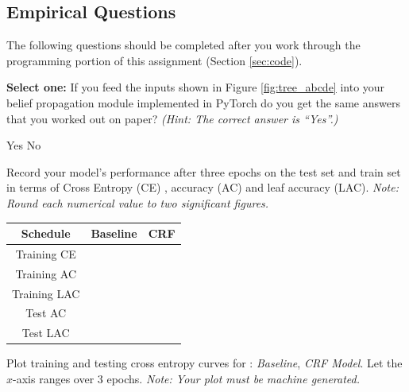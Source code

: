 \documentclass[11pt,addpoints,answers]{exam}
\numberwithin{equation}{section} %
\numberwithin{figure}{section} %
\numberwithin{table}{section} %
\begin{document}
\clearpage
\subsection{Empirical Questions}

The following questions should be completed after you work through the programming portion of this assignment (Section \ref{sec:code}). 

\begin{questions}

\question[1] \textbf{Select one:} If you feed the inputs shown in Figure \ref{fig:tree_abcde} into your belief propagation module implemented in PyTorch do you get the same answers that you worked out on paper? \textit{(Hint: The correct answer is ``Yes''.)}
    \begin{checkboxes}
     \choice Yes
     \choice No
    \end{checkboxes}

\question[10] Record your model's performance after three epochs on the test set and train set in terms of Cross Entropy (CE) , accuracy (AC) and leaf accuracy (LAC). \emph{Note: Round each numerical value to two significant figures.}


\bgroup
\def\arraystretch{1.5}
\begin{center}
\begin{tabular}{ |c|p{2cm}|p{1cm}| } 
 \hline
 \textbf{Schedule} & \textbf{ Baseline} &  \textbf{CRF } \\
 \hline
Training CE &  & \\ 
 \hline
 Training AC &  &  \\ 
 \hline

Training LAC &  &  \\ 
 \hline

Test AC &  &  \\ 
 \hline

Test LAC &  &  \\ 
 \hline


\end{tabular}
\end{center}
\egroup

\question[10] Plot training and testing cross entropy curves for : \emph{Baseline}, \textit{CRF Model}. Let the $x$-axis ranges over 3 epochs. \emph{Note: Your plot must be machine generated.}

\begin{tcolorbox}[fit,height=12cm, width=15cm, blank, borderline={1pt}{-2pt}]
\end{tcolorbox}
\end{questions}
\end{document}
